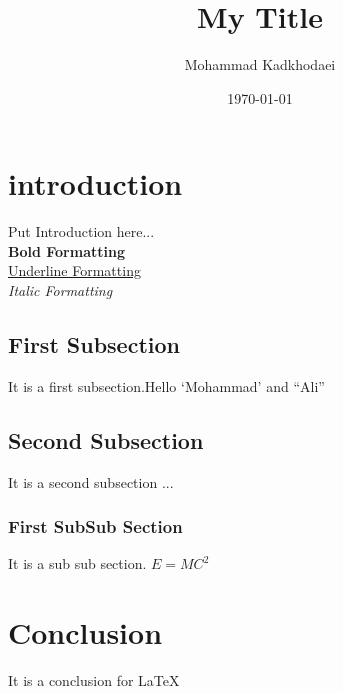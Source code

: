 \documentclass{article}
\title{My Title}
\author{Mohammad Kadkhodaei}
\date{\today}
\begin{document}
\maketitle

\section{introduction}
Put Introduction here... \\
\textbf{Bold Formatting} \\
\underline{Underline Formatting} \\
\emph{Italic Formatting}

\subsection{First Subsection}
It is a first subsection.Hello `Mohammad' and ``Ali''

\subsection{Second Subsection}
It is a second subsection ...

\subsubsection{First SubSub Section}
It is a sub sub section. $E=MC^2$

\section{Conclusion}
It is a conclusion for \LaTeX
\end{document}
